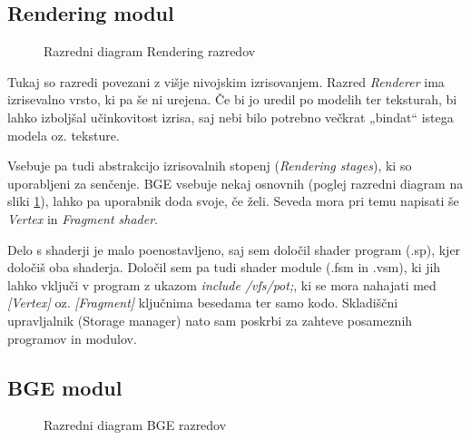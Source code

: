 \documentclass[a4paper]{article}
\begin{document}
\subsection{Rendering modul}
\begin{figure}
  \centering
  
  \label{graf:class_rendering}
  \caption{Razredni diagram Rendering razredov}
\end{figure}
Tukaj so razredi povezani z višje nivojskim izrisovanjem. Razred \emph{Renderer} ima izrisevalno vrsto, ki pa še ni urejena. Če bi jo uredil po modelih ter teksturah, bi lahko izboljšal učinkovitost izrisa, saj nebi bilo potrebno večkrat „bindat“ istega modela oz. teksture.

Vsebuje pa tudi abstrakcijo izrisovalnih stopenj (\emph{Rendering stages}), ki so uporabljeni za senčenje. BGE vsebuje nekaj osnovnih (poglej razredni diagram na sliki \ref{graf:class_rendering}), lahko pa uporabnik doda svoje, če želi. Seveda mora pri temu napisati še \emph{Vertex} in \emph{Fragment shader}.

Delo s shaderji je malo poenostavljeno, saj sem določil shader program (.sp), kjer določiš oba shaderja. Določil sem pa tudi shader module (.fsm in .vsm), ki jih lahko vključi v program z ukazom \emph{include /vfs/pot;}, ki se mora nahajati med \emph{[Vertex]} oz. \emph{[Fragment]} ključnima besedama ter samo kodo. Skladiščni upravljalnik (Storage manager) nato sam poskrbi za zahteve posameznih programov in modulov.

\subsection{BGE modul}
\begin{figure}
  \centering
  
  \label{graf:class_bge}
  \caption{Razredni diagram BGE razredov}
\end{figure}
\end{document}
